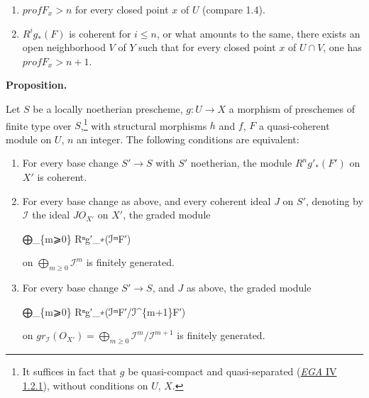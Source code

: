 \documentclass[
  11pt,
  a4paper,
]{book}
\newenvironment{Shaded}{}{}
\newcommand{\NormalTok}[1]{#1}
\providecommand{\tightlist}{%
  \setlength{\itemsep}{0pt}\setlength{\parskip}{0pt}}
\begin{document}
\begin{enumerate}
\def\labelenumi{\arabic{enumi}.}
\tightlist
\item
  \(prof F_{x} > n\) for every closed point \(x\) of \(U\) (compare
  1.4).
\item
  \(R^{i}g_{\ast}(F)\) is coherent for \(i \leqslant n\), or what
  amounts to the same, there exists an open neighborhood \(V\) of \(Y\)
  such that for every closed point \(x\) of \(U \cap V\), one has
  \(prof F_{x} > n + 1\).
\end{enumerate}

\textbf{Proposition.}

Let \(S\) be a locally noetherian prescheme, \(g: U \to X\) a morphism
of preschemes of finite type over \(S\),\footnote{It suffices in fact
  that \(g\) be quasi-compact and quasi-separated
  (\href{https://jcreinhold.github.io/ega/iv/12-ch4-01-relative-finiteness-conditions.html\#12-quasi-separated-morphisms}{\emph{EGA}
  IV 1.2.1}), without conditions on \(U\), \(X\).} with structural
morphisms \(h\) and \(f\), \(F\) a quasi-coherent module on \(U\), \(n\)
an integer. The following conditions are equivalent:

\begin{enumerate}
\def\labelenumi{\arabic{enumi}.}
\item
  For every base change \(S' \to S\) with \(S'\) noetherian, the module
  \(R^{n}g'_{\ast}(F')\) on \(X'\) is coherent.
\item
  For every base change as above, and every coherent ideal \(J\) on
  \(S'\), denoting by \(\mathcal{I}\) the ideal \(J O_{X'}\) on \(X'\),
  the graded module

\begin{Shaded}
\begin{Highlighting}[]
\NormalTok{⨁\_\{m⩾0\} Rⁿg′\_∗(ℐᵐF′)}
\end{Highlighting}
\end{Shaded}

  on \(\bigoplus_{m\geqslant 0} \mathcal{I}^{m}\) is finitely generated.
\item
  For every base change \(S' \to S\), and \(J\) as above, the graded
  module

\begin{Shaded}
\begin{Highlighting}[]
\NormalTok{⨁\_\{m⩾0\} Rⁿg′\_∗(ℐᵐF′/ℐ\^{}\{m+1\}F′)}
\end{Highlighting}
\end{Shaded}

  on
  \(gr_{\mathcal{I}}(O_{X'}) = \bigoplus_{m\geqslant 0} \mathcal{I}^{m}/\mathcal{I}^{m+1}\)
  is finitely generated.
\end{enumerate}
\end{document}
